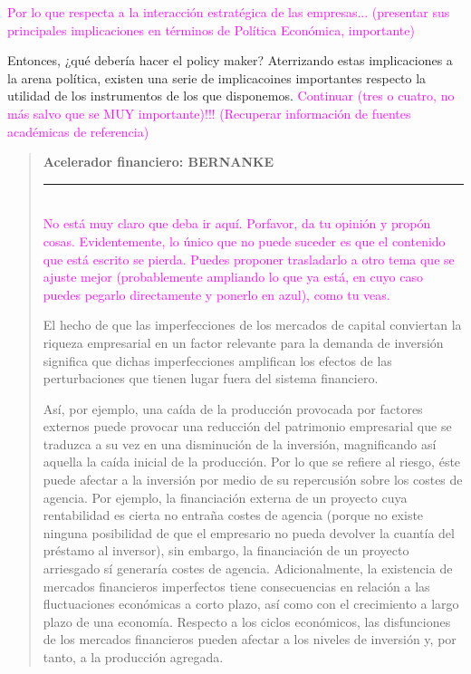\documentclass[10pt,a4paper]{article}
\newenvironment{specialblock}[1]{%
      \begin{quote} %
      \small %
      \noindent\textbf{#1}\\[-0.3em] %
      \rule{\linewidth}{0.4pt}\\[0.6em]}{
      \end{quote}}
\begin{document}
\textcolor{magenta}{Por lo que respecta a la interacción estratégica de las empresas... (presentar sus principales implicaciones en términos de Política Económica, importante)}

Entonces, ¿qué debería hacer el policy maker? Aterrizando estas implicaciones a la arena política, existen una serie de implicacoines importantes respecto la utilidad de los instrumentos de los que disponemos. \textcolor{magenta}{Continuar (tres o cuatro, no más salvo que se MUY importante)!!! (Recuperar información de fuentes académicas de referencia)}

\begin{specialblock}{\textbf{Acelerador financiero: BERNANKE}}
  \textcolor{magenta}{No está muy claro que deba ir aquí. Porfavor, da tu opinión y propón cosas. Evidentemente, lo único que no puede suceder es que el contenido que está escrito se pierda. Puedes proponer trasladarlo a otro tema que se ajuste mejor (probablemente ampliando lo que ya está, en cuyo caso puedes pegarlo directamente y ponerlo en azul), como tu veas. }
  
  El hecho de que las imperfecciones de los mercados de capital conviertan la riqueza empresarial en un factor relevante para la demanda de inversión significa que dichas imperfecciones amplifican los efectos de las perturbaciones que tienen lugar fuera del sistema financiero. 

  Así, por ejemplo, una caída de la producción provocada por factores externos puede provocar una reducción del patrimonio empresarial que se traduzca a su vez en una disminución de la inversión, magnificando así aquella la caída inicial de la producción. Por lo que se refiere al riesgo, éste puede afectar a la inversión por medio de su repercusión sobre los costes de agencia. Por ejemplo, la financiación externa de un proyecto cuya rentabilidad es cierta no entraña costes de agencia (porque no existe ninguna posibilidad de que el empresario no pueda devolver la cuantía del préstamo al inversor), sin embargo, la financiación de un proyecto arriesgado sí generaría costes de agencia. Adicionalmente, la existencia de mercados financieros imperfectos tiene consecuencias en relación a las fluctuaciones económicas a corto plazo, así como con el crecimiento a largo plazo de una economía. Respecto a los ciclos económicos, las disfunciones de los mercados financieros pueden afectar a los niveles de inversión y, por tanto, a la producción agregada. 


\end{specialblock}
\end{document}

